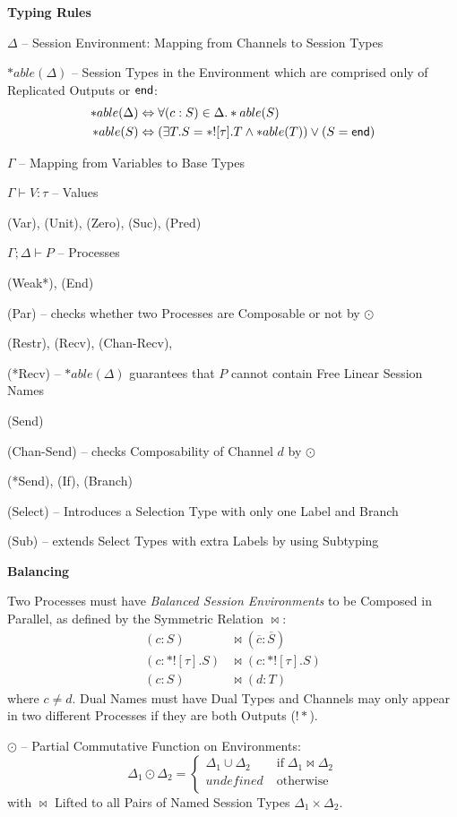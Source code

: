 \textbf{Typing Rules}

$\Delta$ -- Session Environment: Mapping from Channels to Session
Types

$*able(\Delta)$ -- Session Types in the Environment which are
comprised only of Replicated Outputs or $\mathsf{end}$:
\begin{align*}
  *able(\Delta) &\Leftrightarrow \forall(c:S) \in \Delta.*able(S) \\
  *able(S) &\Leftrightarrow (\exists T.S = *![\tau].T
    \wedge *able(T)) \vee (S = \mathsf{end})
\end{align*}

$\Gamma$ -- Mapping from Variables to Base Types

$\Gamma \vdash V:\tau$ -- Values

(Var), (Unit), (Zero), (Suc), (Pred)

$\Gamma;\Delta \vdash P$ -- Processes

(Weak*), (End)

(Par) -- checks whether two Processes are Composable or
not by $\odot$

(Restr), (Recv), (Chan-Recv),

(*Recv) -- $*able(\Delta)$ guarantees that $P$ cannot contain Free
Linear Session Names

(Send)

(Chan-Send) -- checks Composability of Channel $d$ by $\odot$

(*Send), (If), (Branch)

(Select) -- Introduces a Selection Type with only one Label and Branch

(Sub) -- extends Select Types with extra Labels by using Subtyping


\textbf{Balancing}

Two Processes must have \emph{Balanced Session Environments} to be
Composed in Parallel, as defined by the Symmetric Relation $\bowtie$:
\begin{align*}
  (c:S) &\bowtie (\overline{c}:\overline{S}) \\
  (c:*![\tau].S) &\bowtie (c:*![\tau].S) \\
  (c:S) &\bowtie (d:T)
\end{align*}
where $c \neq d$. Dual Names must have Dual Types and Channels may
only appear in two different Processes if they are both Outputs
($!*$). %

$\odot$ -- Partial Commutative Function on Environments:
\[
  \Delta_1 \odot \Delta_2 =
    \begin{cases}
      \Delta_1 \cup \Delta_2 & \;\text{if}\; \Delta_1 \bowtie \Delta_2 \\
      undefined & \;\text{otherwise} \\
    \end{cases}
\]
with $\bowtie$ Lifted to all Pairs of Named Session Types $\Delta_1
\times \Delta_2$.

